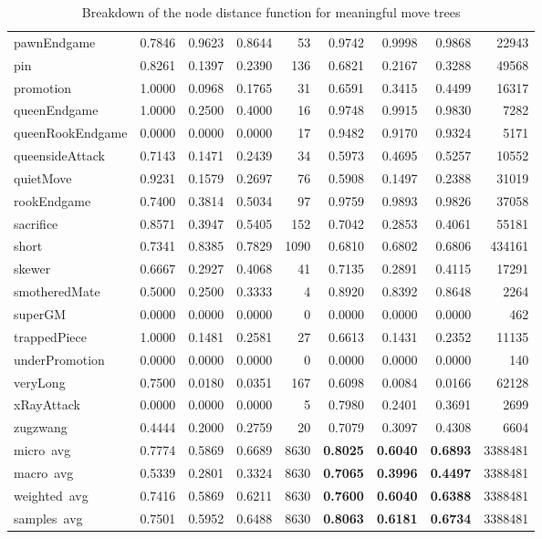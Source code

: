\begin{table}[H]
\begin{adjustbox}{width=\textwidth}
\begin{tabular}{l|rrrr|rrrr}
      \rowcolor{lightgray} pawnEndgame&0.7846&0.9623&0.8644&53&0.9742&0.9998&0.9868&22943\\
      pin&0.8261&0.1397&0.2390&136&0.6821&0.2167&0.3288&49568\\
      promotion&1.0000&0.0968&0.1765&31&0.6591&0.3415&0.4499&16317\\
      \rowcolor{lightgray} queenEndgame&1.0000&0.2500&0.4000&16&0.9748&0.9915&0.9830&7282\\
      \rowcolor{lightgray} queenRookEndgame&0.0000&0.0000&0.0000&17&0.9482&0.9170&0.9324&5171\\
      queensideAttack&0.7143&0.1471&0.2439&34&0.5973&0.4695&0.5257&10552\\
      quietMove&0.9231&0.1579&0.2697&76&0.5908&0.1497&0.2388&31019\\
      \rowcolor{lightgray} rookEndgame&0.7400&0.3814&0.5034&97&0.9759&0.9893&0.9826&37058\\
      sacrifice&0.8571&0.3947&0.5405&152&0.7042&0.2853&0.4061&55181\\
      \rowcolor{lightgray} short&0.7341&0.8385&0.7829&1090&0.6810&0.6802&0.6806&434161\\
      skewer&0.6667&0.2927&0.4068&41&0.7135&0.2891&0.4115&17291\\
      smotheredMate&0.5000&0.2500&0.3333&4&0.8920&0.8392&0.8648&2264\\
      superGM&0.0000&0.0000&0.0000&0&0.0000&0.0000&0.0000&462\\
      trappedPiece&1.0000&0.1481&0.2581&27&0.6613&0.1431&0.2352&11135\\
      underPromotion&0.0000&0.0000&0.0000&0&0.0000&0.0000&0.0000&140\\
      veryLong&0.7500&0.0180&0.0351&167&0.6098&0.0084&0.0166&62128\\
      xRayAttack&0.0000&0.0000&0.0000&5&0.7980&0.2401&0.3691&2699\\
      zugzwang&0.4444&0.2000&0.2759&20&0.7079&0.3097&0.4308&6604\\
      \hline
      micro~avg&0.7774&0.5869&0.6689&8630&\textbf{0.8025}&\textbf{0.6040}&\textbf{0.6893}&3388481\\
      macro~avg&0.5339&0.2801&0.3324&8630&\textbf{0.7065}&\textbf{0.3996}&\textbf{0.4497}&3388481\\
      weighted~avg&0.7416&0.5869&0.6211&8630&\textbf{0.7600}&\textbf{0.6040}&\textbf{0.6388}&3388481\\
      samples~avg&0.7501&0.5952&0.6488&8630&\textbf{0.8063}&\textbf{0.6181}&\textbf{0.6734}&3388481\\
    \end{tabular}
  \end{adjustbox}
  \caption{Breakdown of the node distance function for meaningful move trees}
  \label{labelTable}
\end{table}


